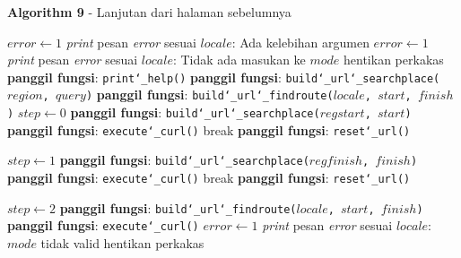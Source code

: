 \begin{algorithm}[h]
	\begin{center}
		\textbf{Algorithm 9} - Lanjutan dari halaman sebelumnya
	\end{center}
	\begin{algorithmic}
			\State $error \gets 1$
			\State \textit{print} pesan \textit{error} sesuai $locale$: Ada kelebihan argumen
		\Else
					\State $error \gets 1$
					\State \textit{print} pesan \textit{error} sesuai $locale$: Tidak ada masukan ke $mode$
					\State hentikan perkakas
				\EndCase
					\State \textbf{panggil fungsi}: \texttt{print\char`_help()}
				\EndCase
					\State \textbf{panggil fungsi}: \texttt{build\char`_url\char`_searchplace($region$, $query$)}
				\EndCase
					\State \textbf{panggil fungsi}: \texttt{build\char`_url\char`_findroute($locale$, $start$, $finish$)}
				\EndCase
					\State $step \gets 0$
					\State \textbf{panggil fungsi}: \texttt{build\char`_url\char`_searchplace($regstart$, $start$)}
					\State \textbf{panggil fungsi}: \texttt{execute\char`_curl()}
						\State break
					\Else
						\State \textbf{panggil fungsi}: \texttt{reset\char`_url()}
					\EndIf
					
					\State $step \gets 1$
					\State \textbf{panggil fungsi}: \texttt{build\char`_url\char`_searchplace($regfinish$, $finish$)}
					\State \textbf{panggil fungsi}: \texttt{execute\char`_curl()}
						\State break
					\Else
						\State \textbf{panggil fungsi}: \texttt{reset\char`_url()}
					\EndIf
					
					\State $step \gets 2$
					\State \textbf{panggil fungsi}: \texttt{build\char`_url\char`_findroute($locale$, $start$, $finish$)}
					\State \textbf{panggil fungsi}: \texttt{execute\char`_curl()}
				\EndCase
				\Default
					\State $error \gets 1$
					\State \textit{print} pesan \textit{error} sesuai $locale$: $mode$ tidak valid
					\State hentikan perkakas
				\EndCase
			\EndSwitch
		\EndIf
		
	\end{algorithmic}
\end{algorithm}
